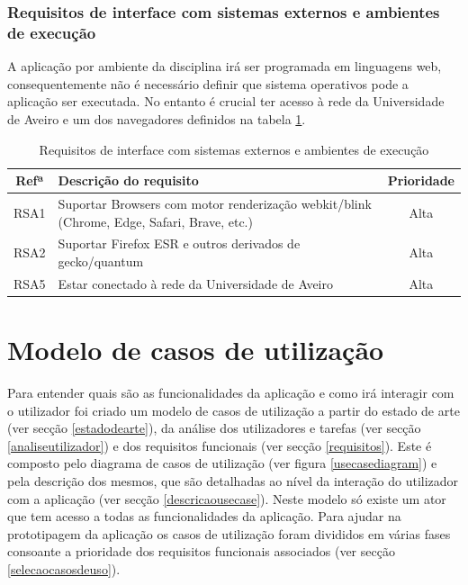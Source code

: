 \documentclass[11pt, twoside]{report}
\begin{document}
	\subsection{Requisitos de interface com sistemas externos e ambientes de execução}
	
	A aplicação por ambiente da disciplina irá ser programada em linguagens web,
	consequentemente não é necessário definir que sistema operativos pode a aplicação ser executada.
	No entanto é crucial ter acesso à rede da Universidade de Aveiro e um dos navegadores definidos na tabela \ref{requisitosdesistemas}.
	
	\def\arraystretch{1.5}
	\begin{table}[H]
		\caption{Requisitos de interface com sistemas externos e ambientes de execução}
		\begin{center}
			\begin{tabularx}{\textwidth}{|c|X|c|}
				\hline
				\textbf{Refª }	& \textbf{Descrição do requisito} & \textbf{Prioridade}\\
				\hline
				RSA1 & Suportar Browsers com motor renderização webkit/blink (Chrome, Edge, Safari, Brave, etc.)  & Alta \\
				\hline
				RSA2 & Suportar Firefox ESR e outros derivados de gecko/quantum & Alta \\
				\hline
				RSA5 & Estar conectado à rede da Universidade de Aveiro & Alta\\
				\hline
			\end{tabularx}
			\label{requisitosdesistemas}
		\end{center}
	\end{table}
		
	
	\chapter{Modelo de casos de utilização}
	
	
	Para entender quais são as funcionalidades da aplicação e como irá interagir com o utilizador foi criado um modelo de casos de utilização a partir do estado de arte (ver secção \ref{estadodearte}), da análise dos utilizadores e tarefas  (ver secção \ref{analiseutilizador}) e dos requisitos funcionais (ver secção \ref{requisitos}).
	Este é composto pelo diagrama de casos de utilização (ver figura \ref{usecasediagram}) e pela descrição dos mesmos, que são detalhadas ao nível da interação do utilizador com a aplicação (ver secção \ref{descricaousecase}).
	Neste modelo só existe um ator que tem acesso a todas as funcionalidades da aplicação. 
	Para ajudar na prototipagem da aplicação os casos de utilização foram divididos em várias fases consoante a prioridade dos requisitos funcionais associados (ver secção \ref{selecaocasosdeuso}).
	
\end{document}
